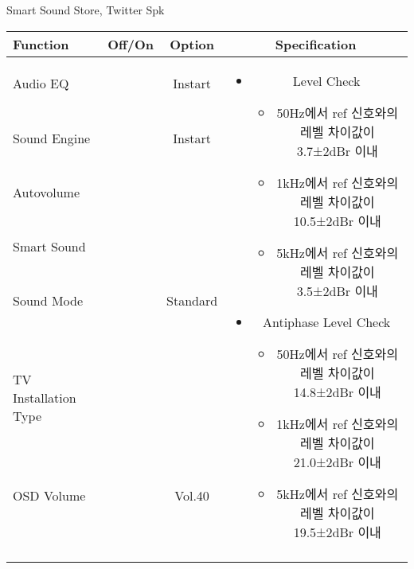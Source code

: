 \begin{frame}[t]{Smart Sound Store, Twitter Spk}
\begin{tiny}
\begin{tabular}{@{}lccc@{}}
\toprule
Function & Off/On & Option & Specification \\
\midrule
Audio EQ & \color{black}{Off} & Instart &
\multirow{10}{60mm}{
\begin{itemize}
	\item Level Check
	\begin{itemize}
		\item 50Hz에서 ref 신호와의 레벨 차이값이 3.7±2dBr 이내
		\item 1kHz에서 ref 신호와의 레벨 차이값이 10.5±2dBr 이내
		\item 5kHz에서 ref 신호와의 레벨 차이값이 3.5±2dBr 이내
	\end{itemize}
	\item Antiphase Level Check
	\begin{itemize}
		\item 50Hz에서 ref 신호와의 레벨 차이값이 14.8±2dBr 이내
		\item 1kHz에서 ref 신호와의 레벨 차이값이 21.0±2dBr 이내
		\item 5kHz에서 ref 신호와의 레벨 차이값이 19.5±2dBr 이내
	\end{itemize}
\end{itemize}
} \\
Sound Engine & \color{blue}{On} & Instart & \\
Autovolume & \color{black}{Off} & & \\
Smart Sound & \color{blue}{On} & & \\
Sound Mode & \color{blue}{On} & Standard & \\
TV Installation Type & \color{blue}{On} & \color{black}{Standtype1} & \\
OSD Volume & \color{blue}{On} & Vol.40 & \\
& & & \\
& & & \\
& & & \\
& & & \\
\midrule
\end{tabular}
\end{tiny}

\end{frame}